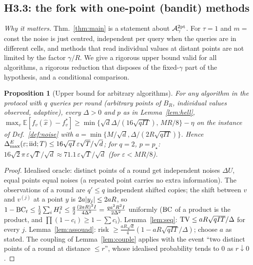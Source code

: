 \documentclass[11pt,a4paper]{article}
\numberwithin{equation}{section}
\newtheorem{proposition}[theorem]{Proposition}
\theoremstyle{definition}
\theoremstyle{remark}
\newcommand{\E}{\mathbb E}\newcommand{\R}{\mathbb R}\newcommand{\Z}{\mathbb Z}\newcommand{\Prob}{\mathbb P}
\newcommand{\Dmax}{\Delta_{\max}}\newcommand{\Dcp}{\Delta_{\rm cp}}\newcommand{\Dlow}{\Delta_{\rm low}}
\begin{document}
\subsection{H3.3: the fork with one-point (bandit) methods}\label{sec:fork}
\emph{Why it matters.} Thm.~\ref{thm:main} is a statement about $\mathcal A^{\rm 2pt}_\gamma$. For $\tau=1$ and $m=$ const the noise is just centred, independent per query when the queries are in different cells, and methods that read individual values at distant points are not limited by the factor $\gamma/R$. We give a rigorous upper bound valid for all algorithms, a rigorous reduction that disposes of the fixed-$\gamma$ part of the hypothesis, and a conditional comparison.

\begin{proposition}[Upper bound for arbitrary algorithms]\label{prop:any}
For any algorithm in the protocol with $q$ queries per round (arbitrary points of $B_R$, individual values observed, adaptive), every $\Delta>0$ and $p$ as in Lemma~\ref{lem:hell},
$\max_v\E[f_v(\hat x)-f_v^*]\ge\min\{\sqrt d\Delta/(16\sqrt{qIT}),\,MR/8\}-\eta$ on the instance of Def.~\ref{def:noise} with $a=\min\{M/\sqrt d,\Delta/(2R\sqrt{qIT})\}$. Hence $\Dmax^E(\varepsilon;\iid;T)\le16\sqrt{qI}\,\varepsilon\sqrt T/\sqrt d$; for $q=2$, $p=p_\star$: $16\sqrt2\pi\,\varepsilon\sqrt T/\sqrt d\approx71.1\,\varepsilon\sqrt T/\sqrt d$ (for $\varepsilon<MR/8$).
\end{proposition}
\begin{proof}
Idealised oracle: distinct points of a round get independent noises $\Delta U$, equal points equal noises (a repeated point carries no extra information). The observations of a round are $q'\le q$ independent shifted copies; the shift between $v$ and $v^{(j)}$ at a point $y$ is $2a\lvert y_j\rvert\le2aR$, so $1-\mathrm{BC}_t\le\frac12\sum_iH_i^2\le\frac q2\frac{(2aR)^2I}{4\Delta^2}=\frac{qa^2R^2I}{2\Delta^2}$ uniformly ($\mathrm{BC}$ of a product is the product, and $\prod(1-c_i)\ge1-\sum c_i$). Lemma~\ref{lem:seq}: $\mathrm{TV}\le aR\sqrt{qIT}/\Delta$ for every $j$. Lemma~\ref{lem:assouad}: risk $\ge\frac{aR\sqrt d}4(1-aR\sqrt{qIT}/\Delta)$; choose $a$ as stated. The coupling of Lemma~\ref{lem:couple} applies with the event ``two distinct points of a round at distance $\le r$'', whose idealised probability tends to $0$ as $r\downarrow0$.
\end{proof}
\end{document}
